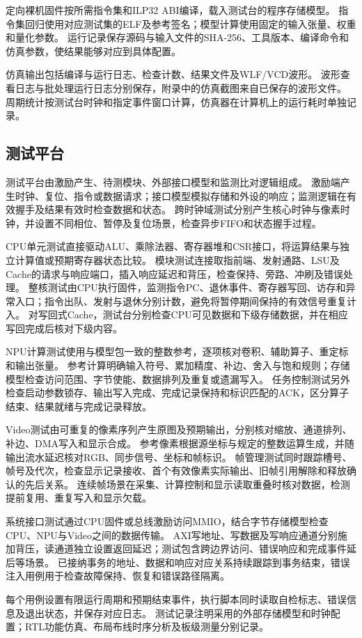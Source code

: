 定向裸机固件按所需指令集和ILP32 ABI编译，载入测试台的程序存储模型。
指令集回归使用对应测试集的ELF及参考签名；模型计算使用固定的输入张量、权重和量化参数。
运行记录保存源码与输入文件的SHA-256、工具版本、编译命令和仿真参数，使结果能够对应到具体配置。

仿真输出包括编译与运行日志、检查计数、结果文件及WLF/VCD波形。
波形查看日志与批处理运行日志分别保存，附录中的仿真截图来自已保存的波形文件。
周期统计按测试台时钟和指定事件窗口计算，仿真器在计算机上的运行耗时单独记录。

\subsection{测试平台}

测试平台由激励产生、待测模块、外部接口模型和监测比对逻辑组成。
激励端产生时钟、复位、指令或数据请求；接口模型模拟存储和外设的响应；监测逻辑在有效握手及结果有效时检查数据和状态。
跨时钟域测试分别产生核心时钟与像素时钟，并设置不同相位、暂停及复位场景，检查异步FIFO和状态握手过程。

CPU单元测试直接驱动ALU、乘除法器、寄存器堆和CSR接口，将运算结果与独立计算值或预期寄存器状态比较。
模块测试连接取指前端、发射通路、LSU及Cache的请求与响应端口，插入响应延迟和背压，检查保持、旁路、冲刷及错误处理。
整核测试由CPU执行固件，监测指令PC、退休事件、寄存器写回、访存和异常入口；指令出队、发射与退休分别计数，避免将暂停期间保持的有效信号重复计入。
对写回式Cache，测试台分别检查CPU可见数据和下级存储数据，并在相应写回完成后核对下级内容。

NPU计算测试使用与模型包一致的整数参考，逐项核对卷积、辅助算子、重定标和输出张量。
参考计算明确输入符号、累加精度、补边、舍入与饱和规则；存储模型检查访问范围、字节使能、数据排列及重复或遗漏写入。
任务控制测试另外检查启动参数锁存、输出写入完成、完成记录保持和标识匹配的ACK，区分算子结束、结果就绪与完成记录释放。

Video测试由可重复的像素序列产生原图及预期输出，分别核对缩放、通道排列、补边、DMA写入和显示合成。
参考像素根据源坐标与规定的整数运算生成，并随输出流水延迟核对RGB、同步信号、坐标和帧标识。
帧管理测试同时跟踪槽号、帧号及代次，检查显示记录接收、首个有效像素实际输出、旧帧引用解除和释放确认的先后关系。
连续帧场景在采集、计算控制和显示读取重叠时核对数据，检测提前复用、重复写入和显示欠载。

系统接口测试通过CPU固件或总线激励访问MMIO，结合字节存储模型检查CPU、NPU与Video之间的数据传输。
AXI写地址、写数据及写响应通道分别施加背压，读通道独立设置返回延迟；测试包含跨边界访问、错误响应和完成事件延后等场景。
已接纳事务的地址、数据和响应对应关系持续跟踪到事务结束，错误注入用例用于检查故障保持、恢复和错误路径隔离。

每个用例设置有限运行周期和预期结束事件，执行脚本同时读取自检标志、错误信息及退出状态，并保存对应日志。
测试记录注明采用的外部存储模型和时钟配置；RTL功能仿真、布局布线时序分析及板级测量分别记录。
